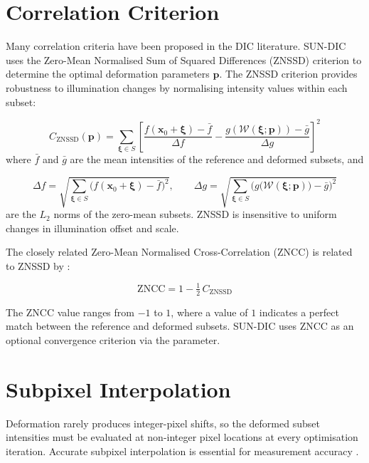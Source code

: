 \section{Correlation Criterion}
\label{sec:znssd}

Many correlation criteria have been proposed in the DIC literature. SUN-DIC uses the
Zero-Mean Normalised Sum of Squared Differences (ZNSSD) criterion to determine the
optimal deformation parameters $\mathbf{p}$.  The ZNSSD criterion provides robustness to illumination changes by normalising intensity values within each subset:

\begin{equation}
	\label{eqn:znssd}
	C_\text{ZNSSD}(\mathbf{p}) =
	\sum_{\boldsymbol{\xi} \in S}
	\left[
	\frac{f(\mathbf{x}_0+\boldsymbol{\xi}) - \bar{f}}{\Delta f}
	-
	\frac{g\!\left(\mathcal{W}(\boldsymbol{\xi};\mathbf{p})\right) - \bar{g}}{\Delta g}
	\right]^2
\end{equation}
where $\bar{f}$ and $\bar{g}$ are the mean intensities of the reference and deformed
subsets, and

\begin{equation}
	\Delta f = \sqrt{\sum_{\boldsymbol{\xi} \in S}
		\bigl(f(\mathbf{x}_0+\boldsymbol{\xi}) - \bar{f}\bigr)^2},
	\qquad
	\Delta g = \sqrt{\sum_{\boldsymbol{\xi} \in S}
		\bigl(g\bigl(\mathcal{W}(\boldsymbol{\xi};\mathbf{p})\bigr) - \bar{g}\bigr)^2}
\end{equation}
are the $L_2$ norms of the zero-mean subsets. ZNSSD is insensitive to uniform changes in illumination offset and scale.

The closely related Zero-Mean Normalised Cross-Correlation (ZNCC) is related to ZNSSD by \citep{Pan2013a}:

\begin{equation}
	\label{eqn:zncc}
	\text{ZNCC} = 1 - \tfrac{1}{2}\,C_\text{ZNSSD}
\end{equation}

The ZNCC value ranges from $-1$ to $1$, where a value of $1$ indicates a perfect match between the reference and deformed subsets. SUN-DIC uses ZNCC as an optional convergence criterion via the  parameter.

\section{Subpixel Interpolation}

Deformation rarely produces integer-pixel shifts, so the deformed subset intensities
must be evaluated at non-integer pixel locations at every optimisation iteration.
Accurate subpixel interpolation is essential for measurement accuracy
\citep{Schreier2000}.

